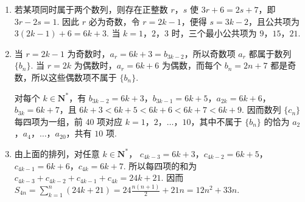 \begin{solution}
\begin{enumerate}
\item 若某项同时属于两个数列，则存在正整数 \(r\)，\(s\) 使 \(3r+6=2s+7\)，即 \(3r-2s=1\). 因此 \(r\) 必为奇数，令 \(r=2k-1\)，便得 \(s=3k-2\)，且公共项为 \(3(2k-1)+6=6k+3\). 当 \(k=1\)，\(2\)，\(3\) 时，三个最小公共项为 \(9\)，\(15\)，\(21\).

\item 当 \(r=2k-1\) 为奇数时，\(a_r=6k+3=b_{3k-2}\)，所以奇数项 \(a_r\) 都属于数列 \(\{b_n\}\). 当 \(r=2k\) 为偶数时，\(a_r=6k+6\) 为偶数，而每个 \(b_n=2n+7\) 都是奇数，所以这些偶数项不属于 \(\{b_n\}\).

对每个 \(k\in\mathbf N^*\)，有
\(b_{3k-2}=6k+3\)，\(b_{3k-1}=6k+5\)，\(a_{2k}=6k+6\)，\(b_{3k}=6k+7\)，且
\(6k+3<6k+5<6k+6<6k+7<6k+9\). 因而数列 \(\{c_n\}\) 每四项为一组，前 40 项对应 \(k=1\)，\(2\)，\(\ldots\)，\(10\)，其中不属于 \(\{b_n\}\) 的恰为 \(a_2\)，\(a_4\)，\(\ldots\)，\(a_{20}\)，共有 \(10\) 项.

\item 由上面的排列，对任意 \(k\in\mathbf N^*\)，
\(c_{4k-3}=6k+3\)，\(c_{4k-2}=6k+5\)，\(c_{4k-1}=6k+6\)，\(c_{4k}=6k+7\). 所以每四项的和为
\(c_{4k-3}+c_{4k-2}+c_{4k-1}+c_{4k}=24k+21\). 因而
\(S_{4n}=\sum_{k=1}^{n}(24k+21)=24\frac{n(n+1)}{2}+21n=12n^2+33n\).
\end{enumerate}
\end{solution}
